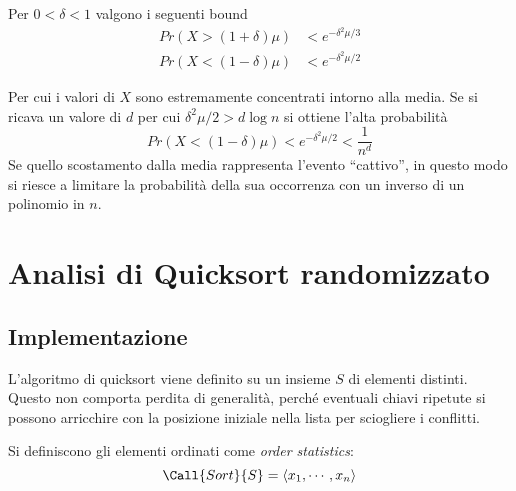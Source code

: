 \begin{corollario}
    Per $
    0 < \delta < 1
    $ valgono i seguenti bound
    \begin{align*}
        Pr \left( 
            X > \left( 1 + \delta \right) \mu
        \right)
        &
        <
        e^{
            -\delta^2 \mu / 3
        }
        \\
        Pr \left( 
            X < \left( 1 - \delta \right) \mu
        \right)
        &
        <
        e^{
            -\delta^2 \mu / 2
        }
    \end{align*}
\end{corollario}
Per cui i valori di $X$ sono estremamente concentrati intorno alla media.
Se si ricava un valore di $d$ per cui $
\delta^2 \mu / 2
> 
d \log n
$ si ottiene l'alta probabilità
\begin{equation*}
    Pr \left( 
        X < \left( 1 - \delta \right) \mu
    \right)
    <
    e^{
        -\delta^2 \mu / 2
    }
    <
    \frac{1}{n^d}
\end{equation*}
Se quello scostamento dalla media rappresenta l'evento ``cattivo'', in questo modo si riesce a limitare la probabilità della sua occorrenza con un inverso di un polinomio in $n$.

\section{Analisi di Quicksort randomizzato}

\subsection{Implementazione}

L'algoritmo di quicksort viene definito su un insieme $S$ di elementi distinti. Questo non comporta perdita di generalità, perché eventuali chiavi ripetute si possono arricchire con la posizione iniziale nella lista per sciogliere i conflitti.

Si definiscono gli elementi ordinati come \emph{order statistics}:
\begin{equation*}
    \Call{Sort}{S}
    =
    \langle x_1, \cdots, x_n \rangle
\end{equation*}


